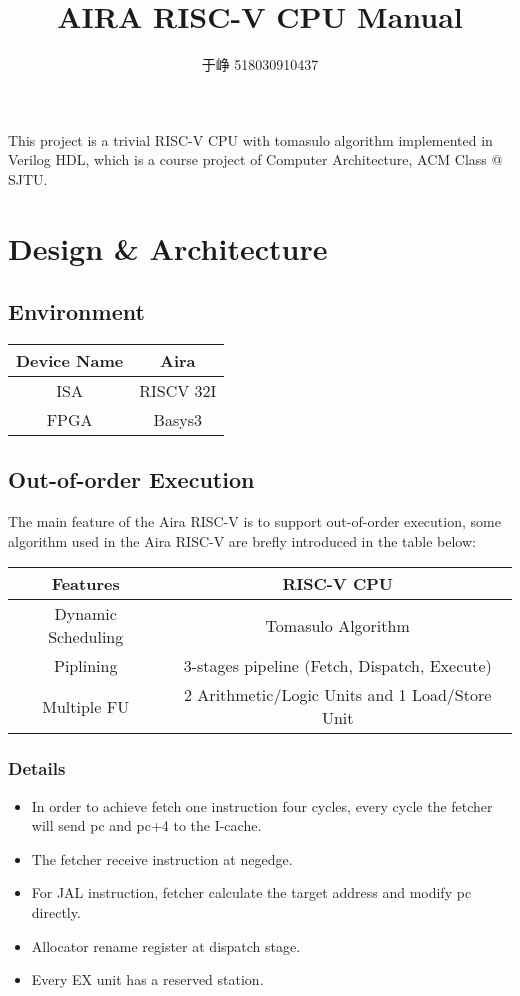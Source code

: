 \documentclass[UTF8]{ctexart}
\begin{document}
\title{AIRA RISC-V CPU Manual}
\author{于峥 518030910437}
\maketitle

This project is a trivial RISC-V CPU with tomasulo algorithm implemented in Verilog HDL, which is a course project of Computer Architecture, ACM Class @ SJTU.
\section{Design \& Architecture}
    \subsection{Environment}
    \begin{center}
        \begin{tabular}{c|c}
            \hline
            Device Name & Aira \\
            \hline
            ISA & RISCV 32I \\
            \hline
            FPGA & Basys3 \\
            \hline
        \end{tabular}
    \end{center}
    \subsection{Out-of-order Execution}
    The main feature of the Aira RISC-V is to support out-of-order execution, some algorithm used in the 
    Aira RISC-V are brefly introduced in the table below:
    \begin{center}
        \begin{tabular}{c|c}
            \hline
            Features & RISC-V CPU\\
            \hline
            Dynamic Scheduling & Tomasulo Algorithm \\
            \hline
            Piplining & 3-stages pipeline (Fetch, Dispatch, Execute)\\
            \hline
            Multiple FU & 2 Arithmetic/Logic Units and 1 Load/Store Unit \\
            \hline
        \end{tabular}
    \end{center}

    \subsubsection{Details}
    \begin{itemize}
    \item In order to achieve fetch one instruction four cycles, every cycle the fetcher will send pc and pc+4 to the I-cache.
    \item The fetcher receive instruction at negedge.
    \item For JAL instruction, fetcher calculate the target address and modify pc directly.
    \item Allocator rename register at dispatch stage.
    \item Every EX unit has a reserved station.
    \end{itemize}
\end{document}
